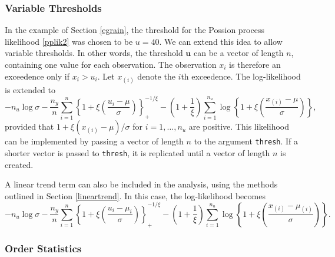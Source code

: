 \documentclass[11pt,a4paper]{article}
\newcommand{\bs}{\boldsymbol}
\begin{document}
\subsubsection{Variable Thresholds}
\label{variablethresh}

In the example of Section \ref{egrain}, the threshold for the Possion
process likelihood \eqref{pplik2} was chosen to be $u=40$.  We can
extend this idea to allow variable thresholds.  In other words, the
threshold $\bs{u}$ can be a vector of length $n$, containing one value
for each observation.  The observation $x_i$ is therefore an
exceedence only if $x_i > u_i$.  Let $x_{(i)}$ denote the $i$th
exceedence.  The log-likelihood is extended to
\begin{equation*}
  -n_u\log \sigma - \frac{n_y}{n} \sum_{i=1}^{n} \left\{1 +
    \xi\left(\frac{u_{i}-\mu}{\sigma}\right)\right\}_{+}^{-1/\xi} -
  \left(1+\frac{1}{\xi}\right) \sum_{i=1}^{n_u} \log\left\{1 +
    \xi\left(\frac{x_{(i)}-\mu}{\sigma}\right)\right\}, 
\end{equation*}
provided that $1 + \xi(x_{(i)}-\mu)/\sigma$ for $i=1,\dots,n_u$ are
positive.  This likelihood can be implemented by passing a vector of
length $n$ to the argument \verb+thresh+.  If a shorter vector is
passed to \verb+thresh+, it is replicated until a vector of length $n$
is created.

A linear trend term can also be included in the analysis, using the
methods outlined in Section \ref{lineartrend}.  In this case, the
log-likelihood becomes
\begin{equation*}
  -n_u\log \sigma - \frac{n_y}{n} \sum_{i=1}^{n} \left\{1 +
    \xi\left(\frac{u_{i}-\mu_{i}}{\sigma}\right)\right\}_{+}^{-1/\xi}
  - \left(1+\frac{1}{\xi}\right) \sum_{i=1}^{n_u} \log\left\{1 +
    \xi\left(\frac{x_{(i)}-\mu_{(i)}}{\sigma}\right)\right\}. 
\end{equation*}

\subsubsection{Order Statistics}
\label{orderstats}
\end{document}
